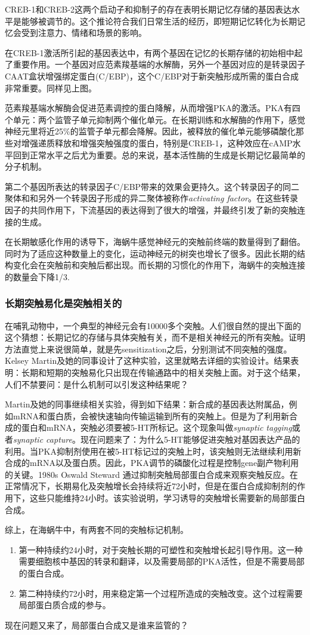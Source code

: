 \documentclass[UTF8,nofonts]{ctexart}
\begin{document}
\par
CREB-1和CREB-2这两个启动子和抑制子的存在表明长期记忆存储的基因表达水平是能够被调节的。这个推论符合我们日常生活的经历，即短期记忆转化为长期记忆会受到注意力、情绪和场景的影响。
\par
在CREB-1激活所引起的基因表达中，有两个基因在记忆的长期存储的初始相中起了重要作用。一个基因对应范素羧基端的水解酶，另外一个基因对应的是转录因子CAAT盒状增强绑定蛋白(C/EBP)，这个C/EBP对于新突触形成所需的蛋白合成非常重要。同样见上图。
\par
范素羧基端水解酶会促进范素调控的蛋白降解，从而增强PKA的激活。PKA有四个单元：两个监管子单元抑制两个催化单元。在长期训练和水解酶的作用下，感觉神经元里将近25\%的监管子单元都会降解。因此，被释放的催化单元能够磷酸化那些对增强递质释放和增强突触强度的蛋白，特别是CREB-1，这种效应在cAMP水平回到正常水平之后尤为重要。总的来说，基本活性酶的生成是长期记忆最简单的分子机制。
\par
第二个基因所表达的转录因子C/EBP带来的效果会更持久。这个转录因子的同二聚体和和另外一个转录因子形成的异二聚体被称作\textit{activating factor}。在这些转录因子的共同作用下，下流基因的表达得到了很大的增强，并最终引发了新的突触连接的生成。
\par
在长期敏感化作用的诱导下，海蜗牛感觉神经元的突触前终端的数量得到了翻倍。同时为了适应这种数量上的变化，运动神经元的树突也增长了很多。因此长期的结构变化会在突触前和突触后都出现。而长期的习惯化的作用下，海蜗牛的突触连接的数量会下降1/3.
\subsubsection{长期突触易化是突触相关的}
在哺乳动物中，一个典型的神经元会有10000多个突触。人们很自然的提出下面的这个猜想：长期记忆的存储与具体突触有关，而不是相关神经元的所有突触。证明方法直觉上来说很简单，就是先sensitization之后，分别测试不同突触的强度。Kelsey Martin及她的同事设计了这种实验，这里就略去详细的实验设计。结果表明：长期和短期的突触易化只出现在传输通路中的相关突触上面。对于这个结果，人们不禁要问：是什么机制可以引发这种结果呢？
\par
Martin及她的同事继续相关实验，得到如下结果：新合成的基因表达附属品，例如mRNA和蛋白质，会被快速轴向传输运输到所有的突触上。但是为了利用新合成的蛋白和mRNA，突触必须要被5-HT所标记。这个现象叫做\textit{synaptic tagging}或者\textit{synaptic capture}。现在问题来了：为什么5-HT能够促进突触对基因表达产品的利用。当PKA抑制剂使用在被5-HT标记过的突触上时，该突触则无法继续利用新合成的mRNA以及蛋白质。因此，PKA调节的磷酸化过程是控制gene副产物利用的关键。1980s Oswald Steward 通过抑制突触局部蛋白合成来观察突触反应。在正常情况下，长期易化及突触增长会持续将近72小时，但是在蛋白合成抑制剂的作用下，这些只能维持24小时。该实验说明，学习诱导的突触增长需要新的局部蛋白合成。
\par
综上，在海蜗牛中，有两套不同的突触标记机制。
\begin{enumerate}
\item 第一种持续约24小时，对于突触长期的可塑性和突触增长起引导作用。这一种需要细胞核中基因的转录和翻译，以及需要局部的PKA活性，但是不需要局部的蛋白合成。
\item 第二种持续约72小时，用来稳定第一个过程所造成的突触改变。这个过程需要局部蛋白质合成的参与。
\end{enumerate}
现在问题又来了，局部蛋白合成又是谁来监管的？
\par
\end{document}
